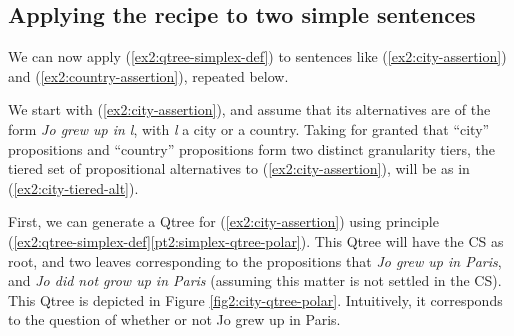 \subsection{Applying the recipe to two simple sentences}

We can now apply (\ref{ex2:qtree-simplex-def}) to sentences like (\ref{ex2:city-assertion}) and (\ref{ex2:country-assertion}), repeated below.

\begin{exe}
	\begin{xlist}
	\end{xlist}
\end{exe}

We start with (\ref{ex2:city-assertion}), and assume that its alternatives are of the form \textit{Jo grew up in l}, with \textit{l} a city or a country. Taking for granted that ``city'' propositions and ``country'' propositions form two distinct granularity tiers, the tiered set of propositional alternatives to (\ref{ex2:city-assertion}), will be as in (\ref{ex2:city-tiered-alt}).

\begin{exe}
	\label{ex2:city-tiered-alt}
\end{exe} 



First, we can generate a Qtree for (\ref{ex2:city-assertion})  using principle (\ref{ex2:qtree-simplex-def}\ref{pt2:simplex-qtree-polar}). This Qtree will have the CS as root, and two leaves corresponding to the propositions that \textit{Jo grew up in Paris}, and \textit{Jo did not grow up in Paris} (assuming this matter is not settled in the CS). This Qtree is depicted in Figure \ref{fig2:city-qtree-polar}. Intuitively, it corresponds to the question of whether or not Jo grew up in Paris.

